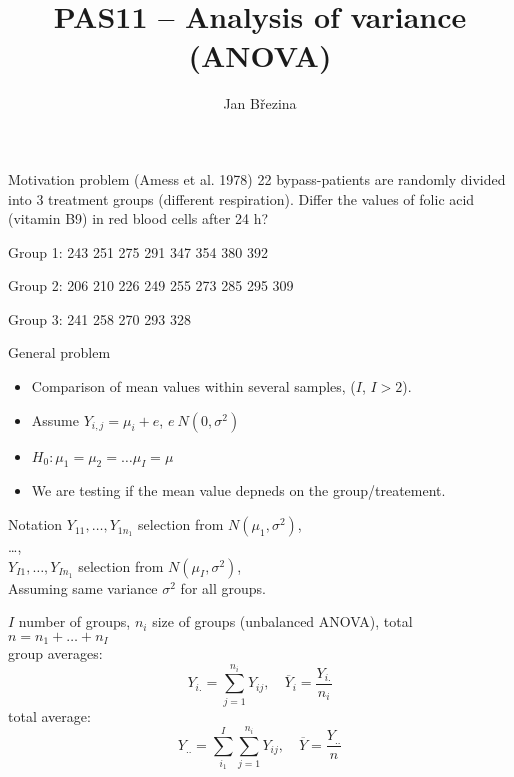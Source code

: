 \documentclass[smaller]{beamer}
\title{PAS11 -- Analysis of variance (ANOVA)}
\author{Jan B\v rezina}
\institute %
{
  Technical University of Liberec
}
\def\ol#1{\overline{#1}}
\def\xskip{{\vspace{2ex}}}
\begin{document}
\begin{frame}
  \titlepage
\end{frame}

\begin{frame}{Motivation problem}
(Amess et al. 1978) 22 bypass-patients are randomly
divided into 3 treatment groups (different respiration). Differ the
values of folic acid (vitamin B9) in red blood cells after 24 h?

\xskip
Group 1:
 243 
 251
 275
 291
 347
 354
 380
 392

Group 2:
 206
 210
 226
 249
 255
 273
 285
 295
 309

Group 3:
 241
 258
 270
 293
 328

\end{frame}


\begin{frame}{General problem}
  \begin{itemize}
   \item Comparison of mean values within several samples, ($I$, $I>2$).\\
   \item Assume $Y_{i,j} = \mu_i+e$, $e~N(0,\sigma^2)$
   \item $H_0: \mu_1=\mu_2=\dots\mu_I=\mu$      
   \item We are testing if the mean value depneds on the group/treatement.
 
  \end{itemize}

\end{frame}

\begin{frame}{Notation}
 $Y_{11}, \dots, Y_{1n_1}$ selection from $N(\mu_1, \sigma^2)$,\\
 \dots,\\
 $Y_{I1}, \dots, Y_{In_1}$ selection from $N(\mu_I, \sigma^2)$,\\
 Assuming same variance $\sigma^2$ for all groups.

\xskip
$I$ number of groups, $n_i$ size of groups (unbalanced ANOVA), total $n = n_1 + \dots + n_I$\\
group averages:
\[
 Y_{i.} = \sum_{j=1}^{n_i} Y_{ij},\quad \ol{Y}_i = \frac{Y_{i.}}{n_i}
\]
total average:
\[
 Y_{..} = \sum_{i_1}^{I}\sum_{j=1}^{n_i} Y_{ij},\quad \ol{Y} = \frac{Y_{..}}{n}
\]

\end{frame}
\end{document}
